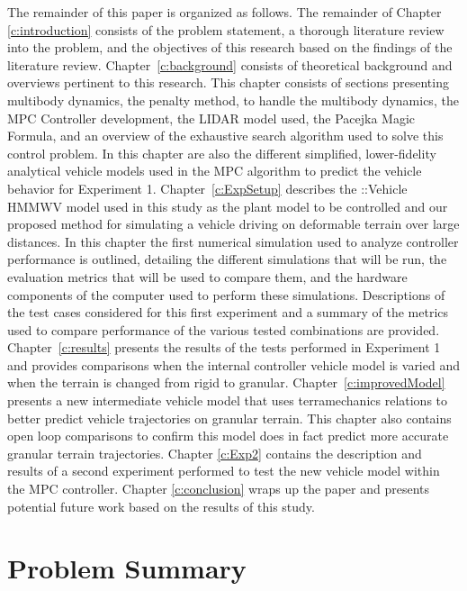 \documentclass[12pt,onecolumn]{report}
\newcommand{\CHRONO}{{\sffamily{{Chrono}}}}
\newcommand{\ChronoVehicle}{{\sffamily{Chrono}}::Vehicle}
\begin{document}
The remainder of this paper is organized as follows. The remainder of Chapter \ref{c:introduction} consists of the problem statement, a thorough literature review into the problem, and the objectives of this research based on the findings of the literature review. Chapter~\ref{c:background} consists of theoretical background and overviews pertinent to this research. This chapter consists of sections presenting multibody dynamics, the penalty method, {\CHRONO} to handle the multibody dynamics, the MPC Controller development, the LIDAR model used, the Pacejka Magic Formula, and an overview of the exhaustive search algorithm used to solve this control problem. In this chapter are also the different simplified, lower-fidelity analytical vehicle models used in the MPC algorithm to predict the {\CHRONO} vehicle behavior for Experiment 1. Chapter~\ref{c:ExpSetup} describes the {\ChronoVehicle} HMMWV model used in this study as the plant model to be controlled and our proposed method for simulating a vehicle driving on deformable terrain over large distances. In this chapter the first numerical simulation used to analyze controller performance is outlined, detailing the different simulations that will be run, the evaluation metrics that will be used to compare them, and the hardware components of the computer used to perform these simulations. Descriptions of the test cases considered for this first experiment and a summary of the metrics used to compare performance of the various tested combinations are provided. Chapter~\ref{c:results} presents the results of the tests performed in Experiment 1 and provides comparisons when the internal controller vehicle model is varied and when the terrain is changed from rigid to granular. Chapter~\ref{c:improvedModel} presents a new intermediate vehicle model that uses terramechanics relations to better predict vehicle trajectories on granular terrain. This chapter also contains open loop comparisons to confirm this model does in fact predict more accurate granular terrain trajectories. Chapter \ref{c:Exp2} contains the description and results of a second experiment performed to test the new vehicle model within the MPC controller. Chapter \ref{c:conclusion} wraps up the paper and presents potential future work based on the results of this study.


\section{Problem Summary}\label{s:ProblemSummary}
\end{document}

